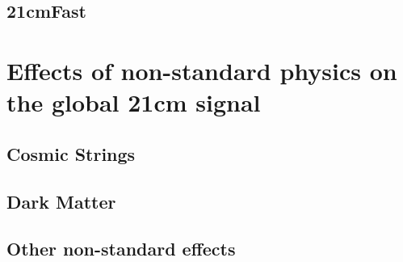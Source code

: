 \documentclass[12pt, TexShade, letterpaper]{report}
\begin{document}
\subsection{21cmFast}
\cite{21cmfast_c}
\cite{21cmfast_python}
\section{Effects of non-standard physics on the global 21cm signal}
\label{chap:global21cm,sub:non_standard}
\subsection{Cosmic Strings}
\cite{cosmic_string_brandenberger} \cite{cosmic_string_oscar} \cite{WF_effect_oscar}
\subsection{Dark Matter}
\cite{constrain_dm_21} \cite{dark_cosmology_21} \cite{noncold_dm_21} \cite{snowmass_dm} \cite{dark_nature_21}
\subsection{Other non-standard effects}
\cite{ee_interaction_21}
\cite{neutrino_21}

\end{document}
